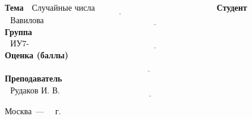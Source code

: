 \begin{titlepage}
	\noindent\textbf{Тема}           $\underline{\text{~~Случайные числа~~~~~~~~~~~~~~~~~~~~~~~~~~~~~~~~~~~~~~~~~~~}}$\newline\newline
	\noindent\textbf{Студент}        $\underline{\text{~~Вавилова В.Л.~~~~~~~~~~~~~~~~~~~~~~~~~~~~~~~~~~~~~~~~~~~~~~~~~~~~~~~~~~~~~~~~~~~~~~~~~~~~~~~~~~~~~~~~~~~~~~~}}$\newline\newline
	\noindent\textbf{Группа}         $\underline{\text{~~ИУ7-74Б~~~~~~~~~~~~~~~~~~~~~~~~~~~~~~~~~~~~~~~~~~~~~~~~~~~~~~~~~~~~~~~~~~~~~~~~~~~~~~~~~~~~~~~~~~~~~~~~~~~~~~}}$\newline\newline
	\noindent\textbf{Оценка (баллы)} $\underline{\text{~~~~~~~~~~~~~~~~~~~~~~~~~~~~~~~~~~~~~~~~~~~~~~~~~~~~~~~~~~~~~~~~~~~~~~~~~~~~~~~~~~~~~~~~~~~~~~~~~~~~~~~~}}$\newline\newline
	\noindent\textbf{Преподаватель}  $\underline{\text{~~Рудаков И. В.~~~~~~~~~~~~~~~~~~~~~~~~~~~~~~~~~~~~~~~~~~~~~~~~~~~~~~~~~~~~~~~~~~~~~~~~~~~~~~~~~~~~~}}$\newline	
	\begin{center}
		\vfill
		Москва~---~\the\year
		~г.
	\end{center}
	\restoregeometry
\end{titlepage}

